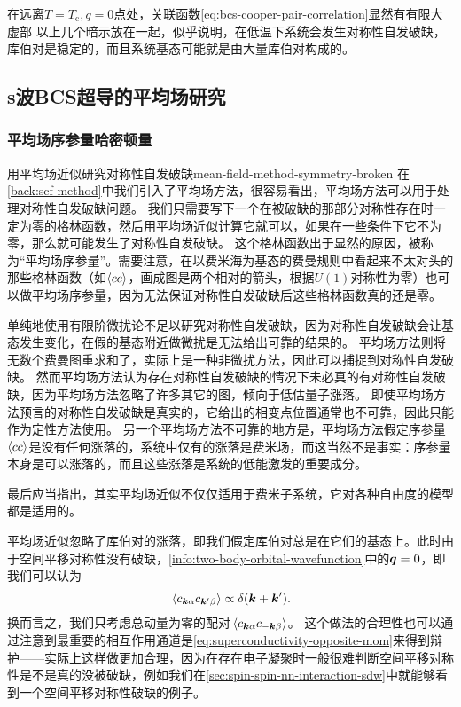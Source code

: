 在远离$T = T_\text{c}, q = 0$点处，关联函数\eqref{eq:bcs-cooper-pair-correlation}显然有有限大虚部
以上几个暗示放在一起，似乎说明，在低温下系统会发生对称性自发破缺，库伯对是稳定的，而且系统基态可能就是由大量库伯对构成的。

\subsection{s波BCS超导的平均场研究}

\subsubsection{平均场序参量哈密顿量}

\begin{back}{用平均场近似研究对称性自发破缺}{mean-field-method-symmetry-broken}
    在\autoref{back:scf-method}中我们引入了平均场方法，很容易看出，平均场方法可以用于处理对称性自发破缺问题。
    我们只需要写下一个在被破缺的那部分对称性存在时一定为零的格林函数，然后用平均场近似计算它就可以，如果在一些条件下它不为零，那么就可能发生了对称性自发破缺。
    这个格林函数出于显然的原因，被称为“平均场序参量”。需要注意，在以费米海为基态的费曼规则中看起来不太对头的那些格林函数（如$\expval{c c}$，画成图是两个相对的箭头，根据$U(1)$对称性为零）也可以做平均场序参量，因为无法保证对称性自发破缺后这些格林函数真的还是零。

    单纯地使用有限阶微扰论不足以研究对称性自发破缺，因为对称性自发破缺会让基态发生变化，在假的基态附近做微扰是无法给出可靠的结果的。
    平均场方法则将无数个费曼图重求和了，实际上是一种非微扰方法，因此可以捕捉到对称性自发破缺。
    然而平均场方法认为存在对称性自发破缺的情况下未必真的有对称性自发破缺，因为平均场方法忽略了许多其它的图，倾向于低估量子涨落。
    即使平均场方法预言的对称性自发破缺是真实的，它给出的相变点位置通常也不可靠，因此只能作为定性方法使用。
    另一个平均场方法不可靠的地方是，平均场方法假定序参量$\expval{cc}$是没有任何涨落的，系统中仅有的涨落是费米场，而这当然不是事实：序参量本身是可以涨落的，而且这些涨落是系统的低能激发的重要成分。

    最后应当指出，其实平均场近似不仅仅适用于费米子系统，它对各种自由度的模型都是适用的。
\end{back}

平均场近似忽略了库伯对的涨落，即我们假定库伯对总是在它们的基态上。此时由于空间平移对称性没有破缺，\autoref{info:two-body-orbital-wavefunction}中的$\vb*{q} = 0$，即我们可以认为
\[
    \expval*{{c}_{\vb*{k}\alpha} {c}_{\vb*{k}' \beta}} \propto \delta(\vb*{k} + \vb*{k}').
\]
换而言之，我们只考虑总动量为零的配对$\expval*{{c}_{\vb*{k} \alpha} {c}_{- \vb*{k} \beta}}$。
这个做法的合理性也可以通过注意到最重要的相互作用通道是\eqref{eq:superconductivity-opposite-mom}来得到辩护——实际上这样做更加合理，因为在存在电子凝聚时一般很难判断空间平移对称性是不是真的没被破缺，例如我们在\autoref{sec:spin-spin-nn-interaction-sdw}中就能够看到一个空间平移对称性破缺的例子。

